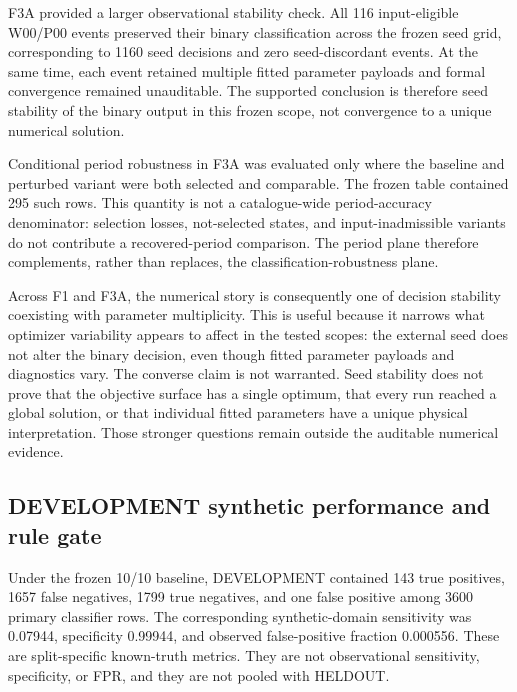 \documentclass[11pt,a4paper]{article}
\begin{document}
F3A provided a larger observational stability check. All 116 input-eligible W00/P00 events preserved their binary classification across the frozen seed grid, corresponding to 1160 seed decisions and zero seed-discordant events. At the same time, each event retained multiple fitted parameter payloads and formal convergence remained unauditable. The supported conclusion is therefore seed stability of the binary output in this frozen scope, not convergence to a unique numerical solution.

Conditional period robustness in F3A was evaluated only where the baseline and perturbed variant were both selected and comparable. The frozen table contained 295 such rows. This quantity is not a catalogue-wide period-accuracy denominator: selection losses, not-selected states, and input-inadmissible variants do not contribute a recovered-period comparison. The period plane therefore complements, rather than replaces, the classification-robustness plane.

Across F1 and F3A, the numerical story is consequently one of decision stability coexisting with parameter multiplicity. This is useful because it narrows what optimizer variability appears to affect in the tested scopes: the external seed does not alter the binary decision, even though fitted parameter payloads and diagnostics vary. The converse claim is not warranted. Seed stability does not prove that the objective surface has a single optimum, that every run reached a global solution, or that individual fitted parameters have a unique physical interpretation. Those stronger questions remain outside the auditable numerical evidence.

\subsection{DEVELOPMENT synthetic performance and rule gate}
Under the frozen 10/10 baseline, DEVELOPMENT contained 143 true positives, 1657 false negatives, 1799 true negatives, and one false positive among 3600 primary classifier rows. The corresponding synthetic-domain sensitivity was 0.07944, specificity 0.99944, and observed false-positive fraction 0.000556. These are split-specific known-truth metrics. They are not observational sensitivity, specificity, or FPR, and they are not pooled with HELDOUT.
\end{document}
